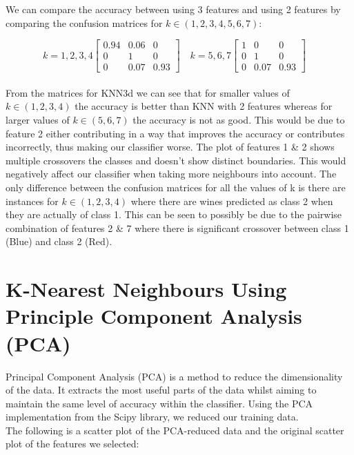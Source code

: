 \documentclass[10pt]{article}
\begin{document}
\noindent
We can compare the accuracy between using 3 features and using 2 features by comparing the confusion matrices for $k \in (1,2,3,4,5,6,7)$:

$$
k=1,2,3,4
\begin{bmatrix} 
0.94 & 0.06 & 0\\
0 & 1 & 0\\
0 & 0.07 & 0.93
\end{bmatrix}
\quad
k=5,6,7
\begin{bmatrix} 
1 & 0 & 0\\
0 & 1 & 0\\
0 & 0.07 & 0.93
\end{bmatrix}
\quad
$$
\noindent
\\
\noindent
From the matrices for KNN3d we can see that for smaller values of $k \in(1,2,3,4)$ the accuracy is better than KNN with 2 features whereas for larger values of $k \in(5,6,7)$ the accuracy is not as good. This would be due to feature 2 either contributing in a way that improves the accuracy or contributes incorrectly, thus making our classifier worse. The plot of features 1 \& 2 shows multiple crossovers the classes and doesn’t show distinct boundaries. This would negatively affect our classifier when taking more neighbours into account. The only difference between the confusion matrices for all the values of k is there are instances for $k \in(1,2,3,4)$ where there are wines predicted as class 2 when they are actually of class 1. This can be seen to possibly be due to the pairwise combination of features 2 \& 7 where there is significant crossover between class 1 (Blue) and class 2 (Red).

\section*{K-Nearest Neighbours Using Principle Component Analysis (PCA)}
Principal Component Analysis (PCA) is a method to reduce the dimensionality of the data. It extracts the most useful parts of the data whilst aiming to maintain the same level of accuracy within the classifier. Using the PCA implementation from the Scipy library, we reduced our training data.\\

\noindent
The following is a scatter plot of the PCA-reduced data and the original scatter plot of the features we selected:
\end{document}
